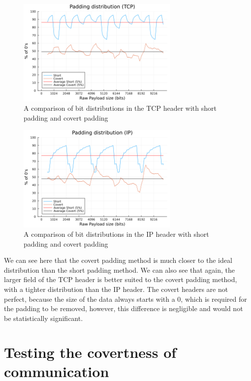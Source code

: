 \begin{figure}[h]
    \centering
    \includegraphics[width=0.7\textwidth]{fig/padding_distribution_TCP.png}
    \caption{A comparison of bit distributions in the TCP header with short padding and covert padding}
    \label{fig:padding_distribution_TCP}
\end{figure}

\begin{figure}[h]
    \centering
    \includegraphics[width=0.7\textwidth]{fig/padding_distribution_IP.png}
    \caption{A comparison of bit distributions in the IP header with short padding and covert padding}
    \label{fig:padding_distribution_IP}
\end{figure}

We can see here that the covert padding method is much closer to the ideal distribution than the short padding method. We can also see that again, the larger field of the TCP header is better suited to the covert padding method, with a tighter distribution than the IP header. The covert headers are not perfect, because the size of the data always starts with a 0, which is required for the padding to be removed, however, this difference is negligible and would not be statistically significant.

\section{Testing the covertness of communication}

